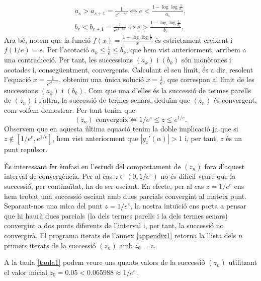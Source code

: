 \documentclass[11pt,a4paper]{article}
\theoremstyle{definition}
\begin{document}
\begin{gather*}
    a_s>a_{s+1}=\frac{1}{e^{e^{1-a_se}}}\iff e<\frac{1-\log\log\frac{1}{a_s}}{a_s},\\
    b_r<b_{r+1}=\frac{1}{e^{e^{1-b_re}}}\iff e>\frac{1-\log\log\frac{1}{b_r}}{b_r}.
\end{gather*}
Ara bé, notem que la funció $f(x)=\frac{1-\log\log\frac{1}{x}}{x}$ és estrictament creixent i $f(1/e)=e$. Per l'acotació $a_k\leq\frac{1}{e}\leq b_k$, que hem vist anteriorment, arribem a una contradicció. Per tant, les successions $(a_k)$ i $(b_k)$ són monòtones i acotades i, consegüentment, convergents. Calculant el seu límit, és a dir, resolent l'equació $x=\frac{1}{e^{e^{1-xe}}}$, obtenim una única solució $x=\frac{1}{e}$, que correspon al límit de les successions $(a_k)$ i $(b_k)$. Com que una d'elles és la successió de termes parells de $(z_n)$ i l'altra, la successió de termes senars, deduïm que $(z_n)$ és convergent, com volíem demostrar. Per tant tenim que $$(z_n)\text{ convergeix}\iff 1/e^e\leq z\leq e^{1/e}.$$ Observem que en aquesta última equació tenim la doble implicació ja que si $z\notin[1/e^e,e^{1/e}]$, hem vist anteriorment que $|g_z'(\alpha)|>1$ i, per tant, $z$ és un punt repulsor.\par
És interessant fer èmfasi en l'estudi del comportament de $(z_n)$ fora d'aquest interval de convergència. Per al cas $z\in(0,1/e^e)$ no és difícil veure que la successió, per continuïtat, ha de ser osci\lgem ant. En efecte, per al cas $z=1/e^e$ ens hem trobat una successió osci\lgem ant amb dues parcials convergint al mateix punt. Separant-nos una mica del punt $z=1/e^e$, la nostra intuïció ens porta a pensar que hi haurà dues parcials (la dels termes parells i la dels termes senars) convergint a dos punts diferents de l'interval i, per tant, la successió no convergirà. El programa {\ttfamily iterats} de l'annex \ref{appendix1} retorna la llista dels $n$ primers iterats de la successió $(z_n)$ amb $z_0=z$.\par
A la taula \ref{taula1} podem veure uns quants valors de la successió $(z_n)$ utilitzant el valor inicial $z_0=0.05<0.065988\approx1/e^e$.\par
\end{document}
